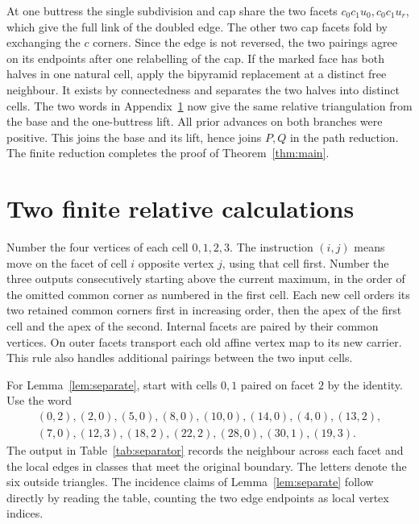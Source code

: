 \documentclass[11pt]{amsart}
\begin{document}
At one buttress the single subdivision and cap share the two
facets \(c_0c_1u_0,c_0c_1u_r\), which give the full link of the doubled
edge. The other two cap facets fold by exchanging the \(c\) corners. Since the
edge is not reversed, the two pairings agree on its endpoints after
one relabelling of the cap. If the marked face has both halves in
one natural cell, apply the bipyramid replacement at a distinct
free neighbour. It exists by connectedness and separates the two
halves into distinct cells. The two words in
Appendix~\ref{sec:certs} now give the same relative triangulation
from the base and the one-buttress lift. All prior advances on both
branches were positive. This joins the base and its lift, hence joins
\(P,Q\) in the path reduction. The finite reduction completes the
proof of Theorem~\ref{thm:main}.

\appendix
\section{Two finite relative calculations}\label{sec:certs}

Number the four vertices of each cell \(0,1,2,3\). The instruction
\((i,j)\) means move on the facet of cell \(i\) opposite vertex \(j\),
using that cell first. Number the three outputs consecutively starting
above the current maximum, in the order of the omitted common
corner as numbered in the first cell. Each new cell orders its two
retained common corners first in increasing order, then the apex of
the first cell and the apex of the second. Internal facets are paired
by their common vertices. On outer facets transport each old affine
vertex map to its new carrier. This rule also handles additional
pairings between the two input cells.

For Lemma~\ref{lem:separate}, start with cells \(0,1\) paired on
facet \(2\) by the identity. Use the word
\[
\begin{gathered}
 (0,2),(2,0),(5,0),(8,0),(10,0),(14,0),(4,0),(13,2),\\
 (7,0),(12,3),(18,2),(22,2),(28,0),(30,1),(19,3).
\end{gathered}
\]
The output in Table~\ref{tab:separator} records the neighbour across
each facet and the local edges in classes that meet the original
boundary. The letters denote the six outside triangles. The incidence
claims of Lemma~\ref{lem:separate} follow directly by reading the
table, counting the two edge endpoints as local vertex indices.
\end{document}
